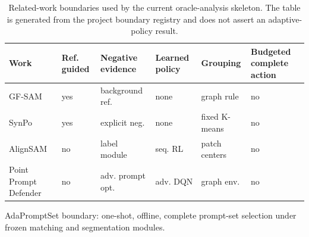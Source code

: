 \begin{table}[t]
\centering
\scriptsize
\setlength{\tabcolsep}{3pt}
\caption{Related-work boundaries used by the current oracle-analysis skeleton. The table is generated from the project boundary registry and does not assert an adaptive-policy result.}
\label{tab:related-work-boundaries}
\begin{tabular}{llllll}
\toprule
Work & Ref. guided & Negative evidence & Learned policy & Grouping & Budgeted complete action \\
\midrule
GF-SAM & yes & background ref. & none & graph rule & no \\
SynPo & yes & explicit neg. & none & fixed K-means & no \\
AlignSAM & no & label module & seq. RL & patch centers & no \\
Point Prompt Defender & no & adv. prompt opt. & adv. DQN & graph env. & no \\
\bottomrule
\end{tabular}

\vspace{0.3em}
\footnotesize AdaPromptSet boundary: one-shot, offline, complete prompt-set selection under frozen matching and segmentation modules.
\end{table}
